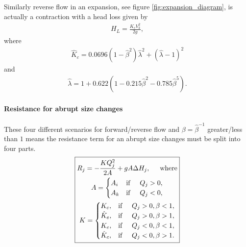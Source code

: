 Similarly reverse flow in an expansion, see figure \ref{fig:expansion_diagram}, is actually a contraction with a head loss given by
\begin{align}
H_L = \frac{\hat{K}_c V_k^2}{2g},
\end{align}
where 
\begin{align*}
\hat{K}_c = 0.0696 \left( 1 - \hat{\beta}^2 \right) \hat{\lambda}^2 + \left( \hat{\lambda} - 1 \right)^2
\end{align*}
and
\begin{align*}
\hat{\lambda} = 1 + 0.622 \left( 1 - 0.215 \hat{\beta}^2 - 0.785 \hat{\beta}^5 \right).
\end{align*}

\paragraph{Resistance for abrupt size changes}

These four different scenarios for forward/reverse flow and $\beta = \hat{\beta}^{-1}$ greater/less than $1$ means the resistance term for an abrupt size changes must be split into four parts. 
\begin{align}\label{abrupt_size_change_resistance}
\boxed{
  \!\begin{gathered}
  R_j = -\frac{K Q_j^2}{2 A} + g A \Delta H_j, \hspace{0.5cm} \text{where} \\
A = \begin{cases}
A_i &\text{if} \hspace{0.5cm} Q_j > 0,\\
A_k &\text{if} \hspace{0.5cm} Q_j < 0,
\end{cases} \nonumber \\
K = \begin{cases} 
K_c, &\text{if} \hspace{0.5cm} Q_j > 0, \beta < 1, \\
\hat{K}_e, &\text{if} \hspace{0.5cm} Q_j > 0, \beta > 1, \\
K_e, &\text{if} \hspace{0.5cm} Q_j < 0, \beta < 1, \\
\hat{K}_c, &\text{if} \hspace{0.5cm} Q_j < 0, \beta > 1.
\end{cases} \nonumber
  \end{gathered}
}
\end{align}